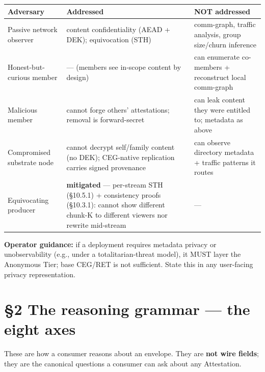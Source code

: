 \documentclass[10pt]{article}
\begin{document}
{\footnotesize
\begin{longtable}{|p{5.33cm}|p{5.33cm}|p{5.33cm}|}\hline
\textbf{Adversary} & \textbf{Addressed} & \textbf{NOT addressed} \\ \hline\endhead
Passive network observer & content confidentiality (AEAD + DEK); equivocation (STH) & comm-graph, traffic analysis, group size/churn inference \\ \hline
Honest-but-curious member & — (members see in-scope content by design) & can enumerate co-members + reconstruct local comm-graph \\ \hline
Malicious member & cannot forge others' attestations; removal is forward-secret & can leak content they were entitled to; metadata as above \\ \hline
Compromised substrate node & cannot decrypt self/family content (no DEK); CEG-native replication carries signed provenance & can observe directory metadata + traffic patterns it routes \\ \hline
Equivocating producer & \textbf{mitigated} — per-stream STH (§10.5.1) + consistency proofs (§10.3.1): cannot show different chunk-K to different viewers nor rewrite mid-stream & — \\ \hline
\end{longtable}}


\textbf{Operator guidance:} if a deployment requires metadata privacy or unobservability (e.g., under a totalitarian-threat model), it MUST layer the Anonymous Tier; base CEG/RET is not sufficient. State this in any user-facing privacy representation.




\clearpage


\section*{§2 The reasoning grammar — the eight axes}


These are how a consumer reasons about an envelope. They are \textbf{not wire fields}; they are the canonical questions a consumer can ask about any Attestation.
\end{document}
